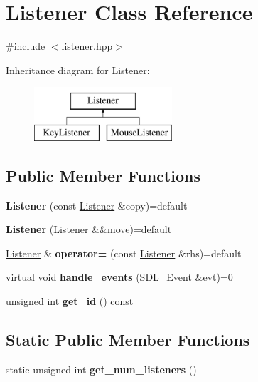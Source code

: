 \hypertarget{class_listener}{}\section{Listener Class Reference}
\label{class_listener}


{\ttfamily \#include $<$listener.\+hpp$>$}

Inheritance diagram for Listener\+:\begin{figure}[H]
\begin{center}
\leavevmode
\includegraphics[height=2.000000cm]{class_listener}
\end{center}
\end{figure}
\subsection*{Public Member Functions}
\begin{DoxyCompactItemize}
\item 
\mbox{\label{class_listener_ab3e6483c6f473dd9700211743afb294a}} 
{\bfseries Listener} (const \mbox{\hyperlink{class_listener}{Listener}} \&copy)=default
\item 
\mbox{\label{class_listener_a606eefbf88f0a072290bb7f3df891e63}} 
{\bfseries Listener} (\mbox{\hyperlink{class_listener}{Listener}} \&\&move)=default
\item 
\mbox{\label{class_listener_aa73bdc3ee858635ea38633543c665b0e}} 
\mbox{\hyperlink{class_listener}{Listener}} \& {\bfseries operator=} (const \mbox{\hyperlink{class_listener}{Listener}} \&rhs)=default
\item 
\mbox{\label{class_listener_a23fc6d7a14eaa5891813b98794ab0fcf}} 
virtual void {\bfseries handle\+\_\+events} (S\+D\+L\+\_\+\+Event \&evt)=0
\item 
\mbox{\label{class_listener_a7f028341ab1458b8c1a6d44e8fc1e0f1}} 
unsigned int {\bfseries get\+\_\+id} () const
\end{DoxyCompactItemize}
\subsection*{Static Public Member Functions}
\begin{DoxyCompactItemize}
\item 
\mbox{\label{class_listener_a6c783b3b1febd9f9c1b5200b0bb470e4}} 
static unsigned int {\bfseries get\+\_\+num\+\_\+listeners} ()
\end{DoxyCompactItemize}


